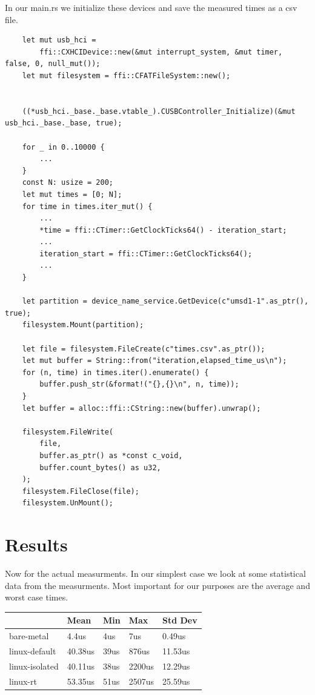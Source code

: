 In our main.rs we initialize these devices and save the measured times as a csv file.
\begin{lstlisting}
    let mut usb_hci =
        ffi::CXHCIDevice::new(&mut interrupt_system, &mut timer, false, 0, null_mut());
    let mut filesystem = ffi::CFATFileSystem::new();


    ((*usb_hci._base._base.vtable_).CUSBController_Initialize)(&mut usb_hci._base._base, true);

    for _ in 0..10000 {
        ...
    }
    const N: usize = 200;
    let mut times = [0; N];
    for time in times.iter_mut() {
        ...
        *time = ffi::CTimer::GetClockTicks64() - iteration_start;
        ...
        iteration_start = ffi::CTimer::GetClockTicks64();
        ...
    }

    let partition = device_name_service.GetDevice(c"umsd1-1".as_ptr(), true);
    filesystem.Mount(partition);

    let file = filesystem.FileCreate(c"times.csv".as_ptr());
    let mut buffer = String::from("iteration,elapsed_time_us\n");
    for (n, time) in times.iter().enumerate() {
        buffer.push_str(&format!("{},{}\n", n, time));
    }
    let buffer = alloc::ffi::CString::new(buffer).unwrap();

    filesystem.FileWrite(
        file,
        buffer.as_ptr() as *const c_void,
        buffer.count_bytes() as u32,
    );
    filesystem.FileClose(file);
    filesystem.UnMount();
\end{lstlisting}

\section{Results}
\label{sec:experiments:results}

Now for the actual measurments.
In our simplest case we look at some statistical data from the measurments.
Most important for our purposes are the average and worst case times.

\begin{table}[h!]
    \label{tab:measurments}
  \begin{tabular}{|l|l|l|l|l|}
    \hline
                   & Mean    & Min  & Max    & Std Dev \\ \hline
    bare-metal     & 4.4us   & 4us  & 7us    & 0.49us  \\ \hline
    linux-default  & 40.38us & 39us & 876us  & 11.53us \\ \hline
    linux-isolated & 40.11us & 38us & 2200us & 12.29us \\ \hline
    linux-rt       & 53.35us & 51us & 2507us & 25.59us \\ \hline
  \end{tabular}
\end{table}

